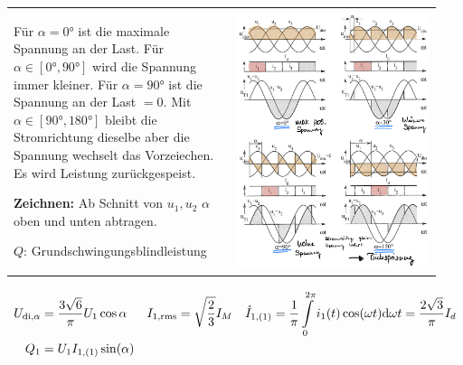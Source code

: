 \documentclass[10pt,landscape]{scrartcl}
\newcommand{\Int}{\int\limits}
\begin{document}
\begin{multicols}{2}
\begin{tabular}{b{0.49\linewidth} p{0.45\linewidth}}
  Für $\alpha=\ang{0}$ ist die maximale Spannung an der Last. Für $\alpha\in[\ang{0},\ang{90}]$ wird die Spannung immer kleiner. Für $\alpha=\ang{90}$ ist die Spannung an der Last $=0$. Mit $\alpha\in[\ang{90},\ang{180}]$ bleibt die Stromrichtung dieselbe aber die Spannung wechselt das Vorzeiechen. Es wird Leistung zurückgespeist.
  
  \textbf{Zeichnen:} Ab Schnitt von $u_1,u_2$ $\alpha$ oben und unten abtragen.

  $Q$: Grundschwingungsblindleistung
  &
  \includegraphics[width=\linewidth]{img/3p/graph.png}%
\end{tabular}


\begin{align*}
  U_{\textup{di,}\alpha} &= \frac{3\sqrt{6}}{\pi} U_1\cos{\alpha} &
  I_{1,\textup{rms}} &= \sqrt{\frac{2}{3}}I_M &
  \hat{I}_{1,(1)} &= \frac{1}{\pi}\Int_0^{2\pi}i_1(t)\cos(\omega t) \mathrm{d}\omega t = \frac{2\sqrt{3}}{\pi}I_d \\
  Q_1 &= U_1I_{1,(1)}\sin(\alpha) &
\end{align*}



\end{multicols}
\end{document}
